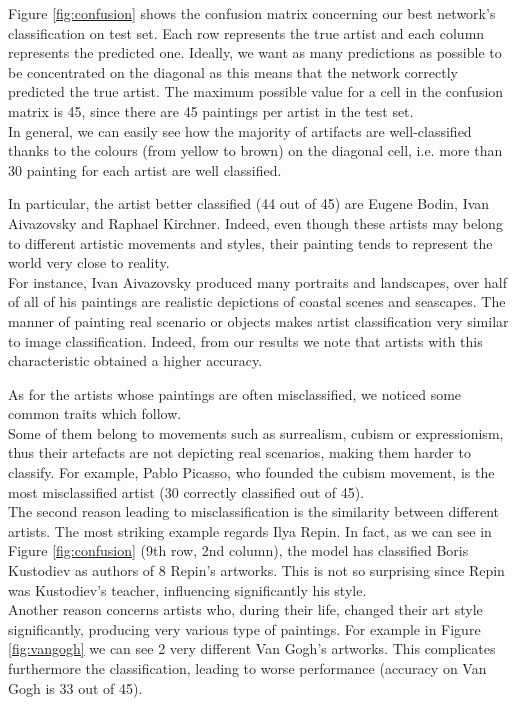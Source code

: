 \documentclass{article}
\begin{document}
Figure \ref{fig:confusion} shows the confusion matrix concerning our best network's classification on test set. Each row represents the true artist and each column represents the predicted one. Ideally, we want as many predictions as possible to be concentrated on the diagonal as this means that the network correctly predicted the true artist. The maximum possible value for a cell in the confusion matrix is 45, since there are 45 paintings per artist in the test set.\\
In general, we can easily see how the majority of artifacts are well-classified thanks to the colours (from yellow to brown) on the diagonal cell, i.e. more than 30 painting for each artist are well classified.

In particular, the artist better classified (44 out of 45) are Eugene Bodin, Ivan Aivazovsky and Raphael Kirchner. Indeed, even though these artists may belong to different artistic movements and styles, their painting tends to represent the world very close to reality.\\
For instance, Ivan Aivazovsky produced many portraits and landscapes, over half of all of his paintings are realistic depictions of coastal scenes and seascapes. The manner of painting real scenario or objects makes artist classification very similar to image classification. Indeed, from our results we note that artists with this characteristic obtained a higher accuracy.

As for the artists whose paintings are often misclassified, we noticed some common traits which follow.\\
Some of them belong to movements such as surrealism, cubism or expressionism, thus their artefacts are not depicting real scenarios, making them harder to classify.
For example, Pablo Picasso, who founded the cubism movement, is the most misclassified artist (30 correctly classified out of 45).\\
The second reason leading to misclassification is the similarity  between different artists. The most striking example regards Ilya Repin. In fact, as we can see in Figure \ref{fig:confusion} (9th row, 2nd column), the model has classified Boris Kustodiev as authors of 8 Repin's artworks. This is not so surprising since Repin was Kustodiev's teacher, influencing significantly his style. \\
Another reason concerns artists who, during their life, changed their art style significantly, producing very various type of paintings. For example in Figure \ref{fig:vangogh} we can see 2 very different Van Gogh's artworks. This complicates furthermore the classification, leading to worse performance (accuracy on Van Gogh is 33 out of 45).
\end{document}
